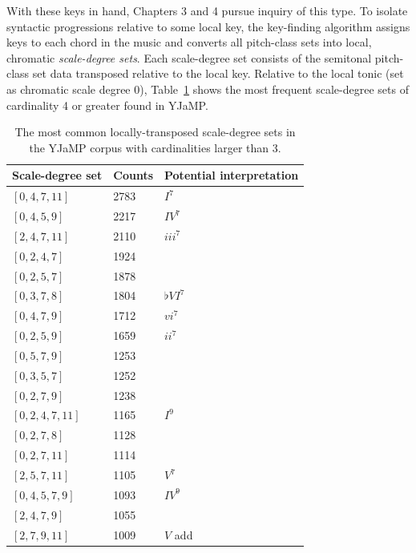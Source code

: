 With these keys in hand, Chapters 3 and 4 pursue inquiry of this type.  To isolate syntactic progressions relative to some local key, the key-finding algorithm assigns keys to each chord in the music and converts all pitch-class sets into local, chromatic \emph{scale-degree sets}.  Each scale-degree set consists of the semitonal pitch-class set data transposed relative to the local key.  Relative to the local tonic (set as chromatic scale degree 0), Table~\ref{sds} shows the most frequent scale-degree sets of cardinality 4 or greater found in YJaMP.

\begin{table}
\caption{The most common locally-transposed scale-degree sets in the YJaMP corpus with cardinalities larger than 3.}
  \centering
\begin{tabular}{l | l | l}
\hline\hline
Scale-degree set & Counts & Potential interpretation \\ [0.5ex]
\hline
$[0, 4, 7, 11]$ &	2783	& $I^7$ \\
$[0, 4, 5, 9]$ &	2217	& $IV^7$\\
$[2, 4, 7, 11]$ &	2110	& $iii^7$\\
$[0, 2, 4, 7]$ &	1924	&\\
$[0, 2, 5, 7]$ &	1878	&\\
$[0, 3, 7, 8]$ &	1804	& $\flat VI^7$\\
$[0, 4, 7, 9]$ &	1712	& $vi^7$\\
$[0, 2, 5, 9]$ &	1659	& $ii^7$\\
$[0, 5, 7, 9]$ &	1253	&\\
$[0, 3, 5, 7]$ &	1252	&\\
$[0, 2, 7, 9]$ &	1238	&\\
$[0, 2, 4, 7, 11]$ &	1165 &	$I^9$\\
$[0, 2, 7, 8]$ &	1128	&\\
$[0, 2, 7, 11]$ &	1114	&\\
$[2, 5, 7, 11]$ &	1105	& $V^7$\\
$[0, 4, 5, 7, 9]$ &	1093	& $IV^9$\\
$[2, 4, 7, 9]$ &	1055	&\\
$[2, 7, 9, 11]$ &	1009	& $V$ add \nth{9}\\[1ex]	 
\hline
\end{tabular}
\label{sds}
\end{table}

